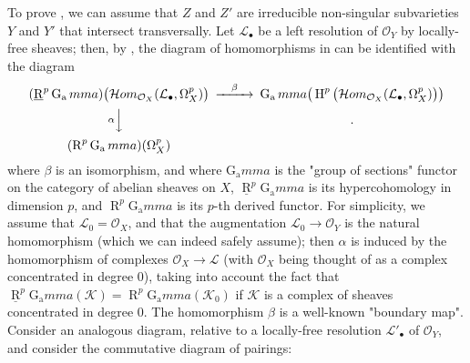 \begin{cproof}
  To prove , we can assume that $Z$ and $Z'$ are irreducible non-singular subvarieties $Y$ and $Y'$ that intersect transversally.
  Let $\mathcal{L}_\bullet$ be a left resolution of $\mathcal{O}_Y$ by locally-free sheaves;
  then, by , the diagram of homomorphisms in  can be identified with the diagram
  \[
    \begin{CD}
      (\underline{\operatorname{R}}^p\operatorname{G_a}mma)\big(\mathcal{H}om_{\mathcal{O}_X}(\mathcal{L}_\bullet,\Omega_X^p)\big) @>\beta>> \operatorname{G_a}mma\big(\operatorname{H}^p\big(\mathcal{H}om_{\mathcal{O}_X}(\mathcal{L}_\bullet,\Omega_X^p)\big)\big)
      \\@V\alpha VV .
      \\(\operatorname{R}^p\operatorname{G_a}mma)(\Omega_X^p)
    \end{CD}
  \]
  where $\beta$ is an isomorphism, and where $\operatorname{G_a}mma$ is the "group of sections" functor on the category of abelian sheaves on $X$, $\underline{\operatorname{R}}^p\operatorname{G_a}mma$ is its hypercohomology in dimension $p$, and $\operatorname{R}^p\operatorname{G_a}mma$ is its $p$-th derived functor.
  For simplicity, we assume that $\mathcal{L}_0=\mathcal{O}_X$, and that the augmentation $\mathcal{L}_0\to\mathcal{O}_Y$ is the natural homomorphism (which we can indeed safely assume);
  then $\alpha$ is induced by the homomorphism of complexes $\mathcal{O}_X\to\mathcal{L}$ (with $\mathcal{O}_X$ being thought of as a complex concentrated in degree $0$), taking into account the fact that $\underline{\operatorname{R}}^p\operatorname{G_a}mma(\mathcal{K})=\operatorname{R}^p\operatorname{G_a}mma(\mathcal{K}_0)$ if $\mathcal{K}$ is a complex of sheaves concentrated in degree $0$.
  The homomorphism $\beta$ is a well-known "boundary map".
  Consider an analogous diagram, relative to a locally-free resolution $\mathcal{L}'_\bullet$ of $\mathcal{O}_Y$, and consider the commutative diagram of pairings:


\end{cproof}
